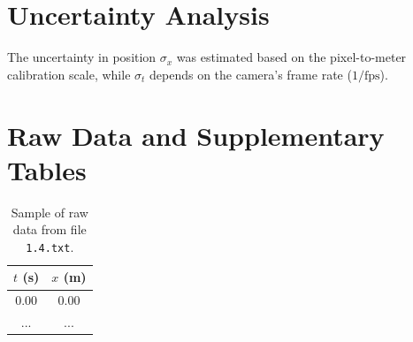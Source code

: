 \documentclass[a4paper,11pt]{article}
\begin{document}
\appendix
\section{Uncertainty Analysis}
The uncertainty in position $\sigma_x$ was estimated based on the pixel-to-meter calibration scale, while $\sigma_t$ depends on the camera's frame rate ($1/\text{fps}$).

\section{Raw Data and Supplementary Tables}
\begin{table}[H]
    \centering
    \begin{tabular}{cc}
        \toprule
        $t$ (\unit{s}) & $x$ (\unit{m}) \\
        \midrule
        0.00 & 0.00 \\
        ... & ... \\
        \bottomrule
    \end{tabular}
    \caption{Sample of raw data from file \texttt{1.4.txt}.}
\end{table}

\printbibliography
\end{document}
